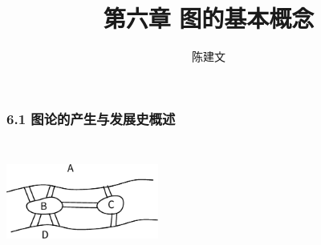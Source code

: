 \documentclass{beamer}
\begin{document}
\begin{CJK}{UTF8}{gbsn}
\newtheorem{Ex}{习题}
\newtheorem{definition1.1.1}{定义1.1.1}
\newtheorem{definition6.2.1}{定义6.2.1}
\newtheorem{definition6.2.2}{定义6.2.2}
\newtheorem{definition6.2.3}{定义6.2.3}
\newtheorem{definition6.2.4}{定义6.2.4}
\newtheorem{definition6.2.5}{定义6.2.5}
\newtheorem{definition6.2.6}{定义6.2.6}
\newtheorem{definition6.2.7}{定义6.2.7}
\newtheorem{definition6.2.8}{定义6.2.8}
\newtheorem{definition6.2.9}{定义6.2.9}
\newtheorem{definition6.2.10}{定义6.2.10}

\newtheorem{definition6.3.1}{定义6.3.1}
\newtheorem{definition6.3.2}{定义6.3.2}
\newtheorem{definition6.3.3}{定义6.3.3}
\newtheorem{definition6.3.4}{定义6.3.4}
\newtheorem{definition6.3.5}{定义6.3.5}
\newtheorem{theorem6.3.1}{定理6.3.1}





\newtheorem{definition6.4.1}{定义6.4.1}
\newtheorem{definition6.4.2}{定义6.4.2}
\newtheorem{definition6.4.3}{定义6.4.3}
\newtheorem{definition6.4.4}{定义6.4.4}
\newtheorem{definition6.4.5}{定义6.4.5}
\newtheorem{definition6.4.6}{定义6.4.6}
\newtheorem{definition6.4.7}{定义6.4.7}

\newtheorem{definition1}{Problem Statement}
\newtheorem{theorem6.4.1}{定理6.4.1}
\newtheorem{theorem6.4.2}{定理6.4.2}
\newtheorem{theorem6.4.3}{定理6.4.3}
\newtheorem{Thm1}{Theorem1}
\newtheorem{Thm2}{Theorem2}
\newtheorem{Thm3}{Theorem3}
\newtheorem{Thm4}{Theorem4}

\newtheorem{definition6.5.1}{定义6.5.1}
\newtheorem{definition6.5.2}{定义6.5.2}

\newtheorem{theorem6.5.1}{定理6.5.1}
\newtheorem{theorem6.5.2}{定理6.5.2}
\newtheorem{theorem6.5.3}{定理6.5.3}

\newtheorem{definition6.6.1}{定义6.6.1}
\newtheorem{theorem6.6.1}{定理6.6.1}
\newtheorem{theorem6.6.2}{定理6.6.2}
\newtheorem{theorem6.6.3}{定理6.6.3}
\newtheorem{theorem6.6.4}{引理6.6.1}



\newtheorem{theorem6.2.1}{定理6.2.1}
\newtheorem{theorem6.2.2}{推论6.2.1}
\newtheorem{example1}{例:}

\date{}
\author{陈建文}

\title{第六章 图的基本概念}
\begin{frame}
  \titlepage
\end{frame}  
\begin{frame}
  \frametitle{6.1 图论的产生与发展史概述}
  \centering
\includegraphics[width=5cm,height=4cm]{konigsberg} 
\end{frame}



\end{CJK}
\end{document}
